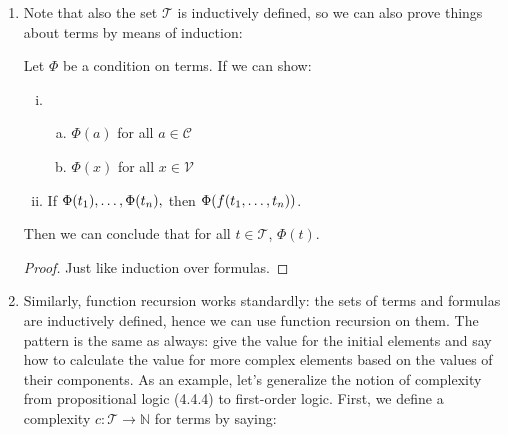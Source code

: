 \begin{enumerate}[\thesection.1]
\begin{theorem}
\begin{enumerate}[(i)]
\begin{enumerate}[(a)]
			\item For all $\phi,\psi\in\mathcal{L}$, if $\Phi(\phi)$ and $\Phi(\psi)$, then $\Phi((\phi\circ\psi))$, for $\circ=\land,\lor,\to,\leftrightarrow$.
			
			\item For all $\phi\in\mathcal{L}$, if $\Phi(\phi)$, then $\Phi(Qx\phi)$ for $Q=\forall,\exists$.

		
		\end{enumerate}
		\end{enumerate}
		Then we can conclude that for all $\phi\in\mathcal{L}$, $\Phi(\phi)$.
		\end{theorem}
		\begin{proof}
		Completely analogous to the proof of Theorem 4.2.1 (induction in propositional logic).
		\end{proof}
		
		\item Note that also the set $\mathcal{T}$ is inductively defined, so we can also prove things about terms by means of induction:
		 \begin{theorem}
		Let $\Phi$ be a condition on terms. If we can show:
		\begin{enumerate}[(i)]
		
			\item  \begin{enumerate}[(a)]
			
				\item $\Phi(a)$ for all $a\in\mathcal{C}$
				
				\item $\Phi(x)$ for all $x\in\mathcal{V}$
			
			\end{enumerate}
			
			\item If $\Phi(t_1), \mathellipsis,\Phi(t_n),$ then $\Phi(f(t_1,\mathellipsis,t_n))$.
		\end{enumerate}
		Then we can conclude that for all $t\in\mathcal{T}$, $\Phi(t)$.
		\end{theorem}
		\begin{proof}
		Just like induction over formulas.
		\end{proof}
		
	  \item Similarly, function recursion works standardly:
		the sets of terms and formulas are inductively defined, hence we can use function recursion on them.
		The pattern is the same as always: give the value for the initial elements and say how to calculate the value for more complex elements based on the values of their components.
		As an example, let's generalize the notion of complexity from propositional logic (4.4.4) to first-order logic.
		First, we define a complexity
		$c:\mathcal{T}\to\mathbb{N}$
		for terms by saying:
	\begin{enumerate}[(i)]
	

\end{enumerate}
\end{enumerate}

